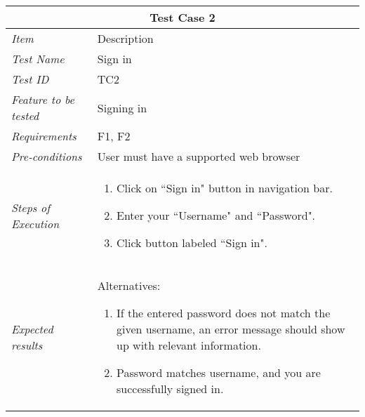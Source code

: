 %
\begin{minipage}{\linewidth}
\setlength{\tabcolsep}{15pt}
\centering
{}
\begin{tabular}{ |l|p{70mm}| }
	\hline
	\multicolumn{2}{|c|}{\cellcolor{gray!25} \textbf{Test Case 2}} \\
	\hline
	\it{\cellcolor{gray!25}Item} & {\cellcolor{gray!25} Description } \\
	\hline
	\it{\cellcolor{gray!25}Test Name } & Sign in \\ \hline
	\it{\cellcolor{gray!25}Test ID} & TC2 \\ \hline
	\it{\cellcolor{gray!25}Feature to be tested} & Signing in \\ \hline
	\it{\cellcolor{gray!25}Requirements} & F1, F2  \\ \hline
	\it{\cellcolor{gray!25}Pre-conditions} & User must have a supported web browser  \\ \hline
	\it{\cellcolor{gray!25}Steps of Execution} & \begin{enumerate}
	                                       \item Click on ``Sign in" button in navigation bar.
	                                       \item Enter your ``Username" and ``Password".
	                                       \item Click button labeled ``Sign in".
	                                     \end{enumerate} \\ \hline
	\it{\cellcolor{gray!25}Expected results} & Alternatives: 
	\begin{enumerate}[label=\alph*)]
	                                       \item If the entered password does not match the given username, an error message should show up with relevant information.
	                                       \item Password matches username, and you are successfully signed in.
	                                     \end{enumerate} \\
	\hline
\end{tabular}
\medskip
\end{minipage}
%
